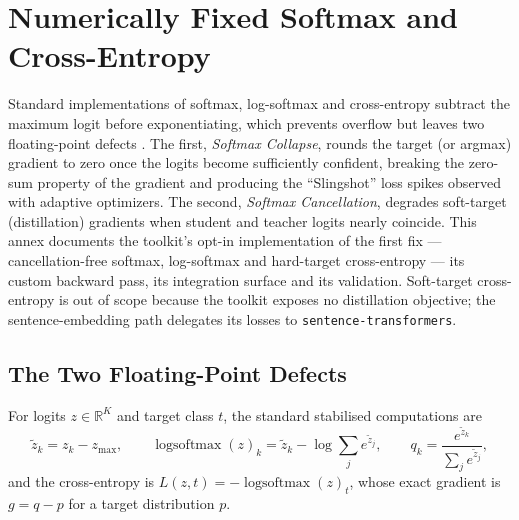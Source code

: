 \section{Numerically Fixed Softmax and Cross-Entropy}
\label{sec:annex-fixed-numerics}

Standard implementations of softmax, log-softmax and cross-entropy subtract the maximum logit before exponentiating, which prevents overflow but leaves two floating-point defects \citep{barron_fixed_softmax_ce_2026}. The first, \emph{Softmax Collapse}, rounds the target (or argmax) gradient to zero once the logits become sufficiently confident, breaking the zero-sum property of the gradient and producing the ``Slingshot'' loss spikes observed with adaptive optimizers. The second, \emph{Softmax Cancellation}, degrades soft-target (distillation) gradients when student and teacher logits nearly coincide. This annex documents the toolkit's opt-in implementation of the first fix --- cancellation-free softmax, log-softmax and hard-target cross-entropy --- its custom backward pass, its integration surface and its validation. Soft-target cross-entropy is out of scope because the toolkit exposes no distillation objective; the sentence-embedding path delegates its losses to \texttt{sentence-transformers}.

\subsection{The Two Floating-Point Defects}

For logits $z \in \mathbb{R}^{K}$ and target class $t$, the standard stabilised computations are
\begin{equation}
\tilde{z}_k = z_k - z_{\max}, \qquad
\operatorname{logsoftmax}(z)_k = \tilde{z}_k - \log \sum_j e^{\tilde{z}_j}, \qquad
q_k = \frac{e^{\tilde{z}_k}}{\sum_j e^{\tilde{z}_j}},
\label{eq:standard-softmax}
\end{equation}
and the cross-entropy is $L(z,t) = -\operatorname{logsoftmax}(z)_t$, whose exact gradient is $g = q - p$ for a target distribution $p$.

